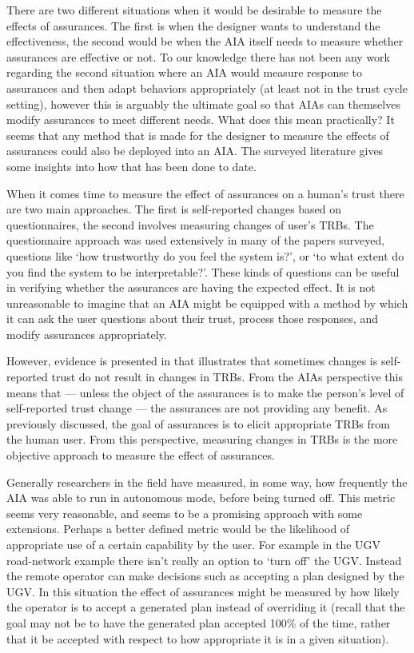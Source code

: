     There are two different situations when it would be desirable to measure the effects of assurances. The first is when the designer wants to understand the effectiveness, the second would be when the AIA itself needs to measure whether assurances are effective or not. To our knowledge there has not been any work regarding the second situation where an AIA would measure response to assurances and then adapt behaviors appropriately (at least not in the trust cycle setting), however this is arguably the ultimate goal so that AIAs can themselves modify assurances to meet different needs. What does this mean practically? It seems that any method that is made for the designer to measure the effects of assurances could also be deployed into an AIA. The surveyed literature gives some insights into how that has been done to date.
   
    When it comes time to measure the effect of assurances on a human's trust there are two main approaches. The first is self-reported changes based on questionnaires, the second involves measuring changes of user's TRBs. The questionnaire approach was used extensively in many of the papers surveyed, questions like `how trustworthy do you feel the system is?', or `to what extent do you find the system to be interpretable?'. These kinds of questions can be useful in verifying whether the assurances are having the expected effect. It is not unreasonable to imagine that an AIA might be equipped with a method by which it can ask the user questions about their trust, process those responses, and modify assurances appropriately.
    
    However, evidence is presented in \cite{Dzindolet2003-ts} that illustrates that sometimes changes is self-reported trust do not result in changes in TRBs. From the AIAs perspective this means that --- unless the object of the assurances is to make the person's level of self-reported trust change --- the assurances are not providing any benefit. As previously discussed, the goal of assurances is to elicit appropriate TRBs from the human user. From this perspective, measuring changes in TRBs is the more objective approach to measure the effect of assurances.

    Generally researchers in the field have measured, in some way, how frequently the AIA was able to run in autonomous mode, before being turned off. This metric seems very reasonable, and seems to be a promising approach with some extensions. Perhaps a better defined metric would be the likelihood of appropriate use of a certain capability by the user. For example in the UGV road-network example there isn't really an option to `turn off' the UGV. Instead the remote operator can make decisions such as accepting a plan designed by the UGV. In this situation the effect of assurances might be measured by how likely the operator is to accept a generated plan instead of overriding it (recall that the goal may not be to have the generated plan accepted 100\% of the time, rather that it be accepted with respect to how appropriate it is in a given situation).

